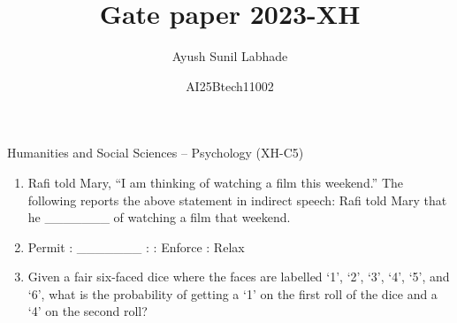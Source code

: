\documentclass[12pt]{article}
\theoremstyle{remark}
\begin{document}
\title{\vspace{-5cm}Gate paper 2023-XH}
\author{Ayush Sunil Labhade}
\date{AI25Btech11002}
\maketitle

\begin{flushright}Humanities and Social Sciences – Psychology (XH-C5)\end{flushright}
\begin{enumerate}
\item Rafi told Mary, “I am thinking of watching a film this weekend.”
The following reports the above statement in indirect speech: 
Rafi told Mary that he \_\_\_\_\_\_\_ of watching a film that weekend.
\begin{enumerate}
\end{enumerate}
\hfill{}
\item Permit : \_\_\_\_\_\_\_ : : Enforce : Relax 
\begin{enumerate}
\end{enumerate}
\hfill{}
\item Given a fair six-faced dice where the faces are labelled ‘1’, ‘2’, ‘3’, ‘4’, ‘5’, and ‘6’, 
what is the probability of getting a ‘1’ on the first roll of the dice and a ‘4’ on the 
second roll?
\begin{enumerate}
    \begin{multicols}{4}

\end{multicols}
\end{enumerate}
\end{enumerate}
\end{document}
